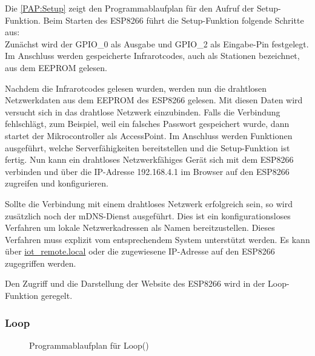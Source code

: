 Die \autoref{PAP:Setup} zeigt den Programmablaufplan für den Aufruf der Setup-Funktion.
Beim Starten des ESP8266 führt die Setup-Funktion folgende Schritte aus:\\
Zunächst wird der \acs{GPIO}\_0 als Ausgabe und \acs{GPIO}\_2 als Eingabe-Pin festgelegt.
Im Anschluss werden gespeicherte Infrarotcodes, auch als Stationen bezeichnet, aus dem \acs{EEPROM} gelesen.

Nachdem die Infrarotcodes gelesen wurden, werden nun die drahtlosen Netzwerkdaten aus dem \acs{EEPROM} des ESP8266 gelesen.
Mit diesen Daten wird versucht sich in das drahtlose Netzwerk einzubinden.
Falls die Verbindung fehlschlägt, zum Beispiel, weil ein falsches Passwort gespeichert wurde, dann startet der Mikrocontroller als AccessPoint.
Im Anschluss werden Funktionen ausgeführt, welche Serverfähigkeiten bereitstellen und die Setup-Funktion ist fertig.
Nun kann ein drahtloses Netzwerkfähiges Gerät sich mit dem ESP8266 verbinden und über die IP-Adresse 192.168.4.1 im Browser auf den ESP8266 zugreifen und konfigurieren.

Sollte die Verbindung mit einem drahtloses Netzwerk erfolgreich sein, so wird zusätzlich noch der \acs{mDNS}-Dienst ausgeführt.
Dies ist ein konfigurationsloses Verfahren um lokale Netzwerkadressen als Namen bereitzustellen.
Dieses Verfahren muss explizit vom entsprechendem System unterstützt werden.
Es kann über \url{iot_remote.local} oder die zugewiesene IP-Adresse auf den ESP8266 zugegriffen werden.

Den Zugriff und die Darstellung der Website des ESP8266 wird in der Loop-Funktion geregelt.
\subsubsection{Loop}
\begin{figure}[!ht]
\centering 
{}
\caption{Programmablaufplan für Loop()}
\label{PAP:Loop}
\end{figure}


